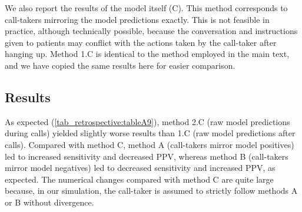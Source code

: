 {We also report the results of the model itself (C). This method corresponds to call-takers mirroring the model predictions exactly. This is not feasible in practice, although technically possible, because the conversation and instructions given to patients may conflict with the actions taken by the call-taker after hanging up. Method 1.C is identical to the method employed in the main text, and we have copied the same results here for easier comparison.


\subsection{Results}

As expected (\cref{tab_retrospective:tableA9}), method 2.C (raw model predictions during calls) yielded slightly worse results than 1.C (raw model predictions after calls). Compared with method C, method A (call-takers mirror model positives) led to increased sensitivity and decreased PPV, whereas method B (call-takers mirror model negatives) led to decreased sensitivity and increased PPV, as expected. The numerical changes compared with method C are quite large because, in our simulation, the call-taker is assumed to strictly follow methods A or B without divergence.

\begin{sidewaystable}
    \centering
    \caption{Overall performance of model, call-takers and simulated combinations of model and call-takers on MH-1813 test data.}
    \label{tab_retrospective:tableA9}
\end{sidewaystable}}
